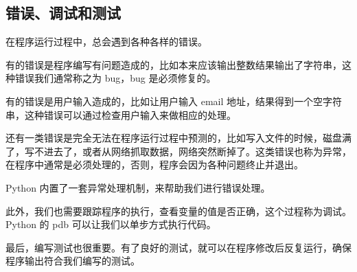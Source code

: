 \hypertarget{ux9519ux8befux8c03ux8bd5ux548cux6d4bux8bd5}{%
\subsection{错误、调试和测试}\label{ux9519ux8befux8c03ux8bd5ux548cux6d4bux8bd5}}

在程序运行过程中，总会遇到各种各样的错误。

有的错误是程序编写有问题造成的，比如本来应该输出整数结果输出了字符串，这种错误我们通常称之为
bug，bug 是必须修复的。

有的错误是用户输入造成的，比如让用户输入 email
地址，结果得到一个空字符串，这种错误可以通过检查用户输入来做相应的处理。

还有一类错误是完全无法在程序运行过程中预测的，比如写入文件的时候，磁盘满了，写不进去了，或者从网络抓取数据，网络突然断掉了。这类错误也称为异常，在程序中通常是必须处理的，否则，程序会因为各种问题终止并退出。

Python 内置了一套异常处理机制，来帮助我们进行错误处理。

此外，我们也需要跟踪程序的执行，查看变量的值是否正确，这个过程称为调试。Python
的 pdb 可以让我们以单步方式执行代码。

最后，编写测试也很重要。有了良好的测试，就可以在程序修改后反复运行，确保程序输出符合我们编写的测试。

